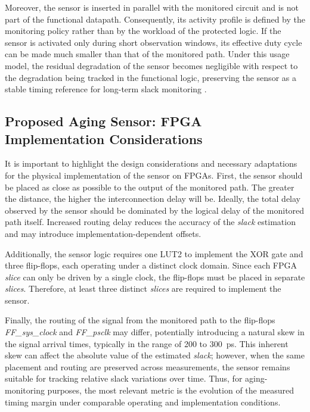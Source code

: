 \documentclass[a4paper,10pt,twoside,twocolumn,final]{JICS_LaTexGuidelines}
\begin{document}
Moreover, the sensor is inserted in parallel with the monitored circuit and is not part of the functional datapath. Consequently, its activity profile is defined by the monitoring policy rather than by the workload of the protected logic. If the sensor is activated only during short observation windows, its effective duty cycle can be made much smaller than that of the monitored path. Under this usage model, the residual degradation of the sensor becomes negligible with respect to the degradation being tracked in the functional logic, preserving the sensor as a stable timing reference for long-term slack monitoring \cite{Jahanirad2023DPGFPGA,Li2022FPGAAgingPrediction}.


\subsection{Proposed Aging Sensor: FPGA Implementation Considerations}
\label{sec:fpga_considerations}

It is important to highlight the design considerations and necessary adaptations for the physical implementation of the sensor on FPGAs. First, the sensor should be placed as close as possible to the output of the monitored path. The greater the distance, the higher the interconnection delay will be. Ideally, the total delay observed by the sensor should be dominated by the logical delay of the monitored path itself. Increased routing delay reduces the accuracy of the \textit{slack} estimation and may introduce implementation-dependent offsets.

Additionally, the sensor logic requires one LUT2 to implement the XOR gate and three flip-flops, each operating under a distinct clock domain. Since each FPGA \textit{slice} can only be driven by a single clock, the flip-flops must be placed in separate \textit{slices}. Therefore, at least three distinct \textit{slices} are required to implement the sensor.

Finally, the routing of the signal from the monitored path to the flip-flops \textit{FF\_sys\_clock} and \textit{FF\_psclk} may differ, potentially introducing a natural skew in the signal arrival times, typically in the range of 200 to 300~ps. This inherent skew can affect the absolute value of the estimated \textit{slack}; however, when the same placement and routing are preserved across measurements, the sensor remains suitable for tracking relative slack variations over time. Thus, for aging-monitoring purposes, the most relevant metric is the evolution of the measured timing margin under comparable operating and implementation conditions.
\end{document}
